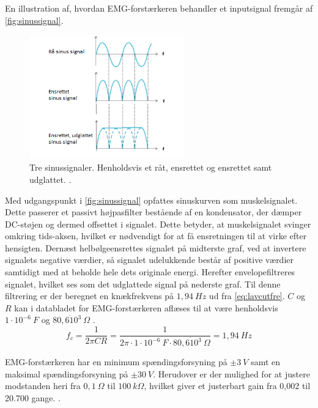 En illustration af, hvordan EMG-forstærkeren behandler et inputsignal fremgår af \autoref{fig:sinussignal}.
\begin{figure}[H]
\centering
\includegraphics[width=0.6\textwidth]{figures/sinussignal.png}
\caption{Tre sinussignaler. Henholdsvis et råt, ensrettet og ensrettet samt udglattet. \citep{advancertech2013}.}
\label{fig:sinussignal}
\end{figure}

\noindent
Med udgangspunkt i \autoref{fig:sinussignal} opfattes sinuskurven som muskelsignalet. Dette passerer et passivt højpasfilter bestående af en kondensator, der dæmper DC-støjen og dermed offsettet i signalet. Dette betyder, at muskelsignalet svinger omkring tids-aksen, hvilket er nødvendigt for at få ensretningen til at virke efter hensigten. Dernæst helbølgeensrettes signalet på midterste graf, ved at invertere signalets negative værdier, så signalet udelukkende består af positive værdier samtidigt med at beholde hele dets originale energi. Herefter envelopefiltreres signalet, hvilket ses som det udglattede signal på nederste graf. Til denne filtrering er der beregnet en knækfrekvens på $1,94~Hz$ ud fra \autoref{eq:lavcutfre}. $C$ og $R$ kan i databladet for EMG-forstærkeren aflæses til at være henholdsvis $1 \cdot 10^{-6}~F$ og $80,6 \dot 10^3~\Omega$ \citep{advancertech2013}. 
\begin{equation}\label{eq:lavcutfre}
f_c = \frac{1}{2 \pi C R} = \frac{1}{2 \pi \cdot 1 \cdot 10^{-6}~F \cdot 80,6 \dot 10^3~\Omega} = 1,94~Hz
\end{equation}

EMG-forstærkeren har en minimum spændingsforsyning på $\pm 3~V$ samt en maksimal spændingsforsyning på $\pm 30~V$. Herudover er der mulighed for at justere modstanden heri fra $0,1~\Omega$ til $100~k\Omega$, hvilket giver et justerbart gain fra 0,002 til 20.700 gange. \citep{advancertech2013}. 